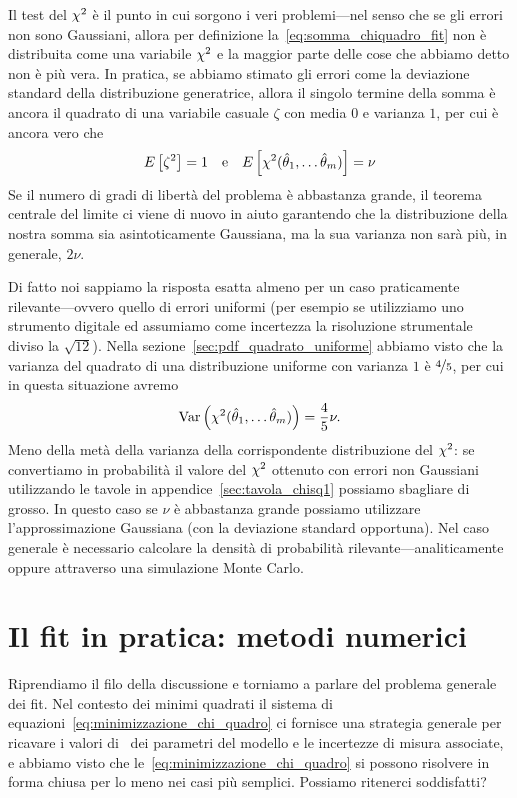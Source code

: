 Il test del $\chi^2$ è il punto in cui sorgono i veri problemi---nel senso che
se gli errori non sono Gaussiani, allora per definizione
la~\eqref{eq:somma_chiquadro_fit} non è distribuita come una variabile
$\chi^2$ e la maggior parte delle cose che abbiamo detto non è più vera.
In pratica, se abbiamo stimato gli errori come la deviazione standard della
distribuzione generatrice, allora il singolo termine della somma è ancora
il quadrato di una variabile casuale $\zeta$ con media $0$ e varianza $1$, per
cui è ancora vero che
\begin{align*}
  \displaystyle E\left[\zeta^2\right] = 1 \quad \text{e} \quad
  \displaystyle E\left[\chi^2(\hat{\theta}_1, \ldots \hat{\theta}_m)\right] = \nu
\end{align*}
Se il numero di gradi di libertà del problema è abbastanza grande, il
teorema centrale del limite ci viene di nuovo in aiuto garantendo che la
distribuzione della nostra somma sia asintoticamente Gaussiana, ma la sua
varianza non sarà più, in generale, $2\nu$.

Di fatto noi sappiamo la risposta esatta almeno per un caso praticamente
rilevante---ovvero quello di errori uniformi (per esempio se utilizziamo uno
strumento digitale ed assumiamo come incertezza la risoluzione strumentale
diviso la $\sqrt{12}$). Nella sezione~\ref{sec:pdf_quadrato_uniforme} abbiamo
visto che la varianza del quadrato di una distribuzione uniforme con varianza
$1$ è $\nicefrac{4}{5}$, per cui in questa situazione avremo
\begin{align*}
  \text{Var}\left(\chi^2(\hat{\theta}_1, \ldots \hat{\theta}_m)\right) = \frac{4}{5}\nu.
\end{align*}
Meno della metà della varianza della corrispondente distribuzione del
$\chi^2$: se convertiamo in probabilità il valore del $\chi^2$ ottenuto con
errori non Gaussiani utilizzando le tavole in appendice~\ref{sec:tavola_chisq1}
possiamo sbagliare di grosso. In questo caso se $\nu$ è abbastanza grande
possiamo utilizzare l'approssimazione Gaussiana (con la deviazione standard
opportuna). Nel caso generale è necessario calcolare la densità di
probabilità rilevante---analiticamente oppure attraverso una simulazione
Monte Carlo.


\section{Il fit in pratica: metodi numerici}

Riprendiamo il filo della discussione e torniamo a parlare del problema
generale dei fit. Nel contesto dei minimi quadrati il sistema di
equazioni~\eqref{eq:minimizzazione_chi_quadro} ci fornisce una strategia
generale per ricavare i valori di \bestfit\ dei parametri del modello e
le incertezze di misura associate, e abbiamo visto che
le~\eqref{eq:minimizzazione_chi_quadro} si possono risolvere in forma chiusa
per lo meno nei casi più semplici. Possiamo ritenerci soddisfatti?

